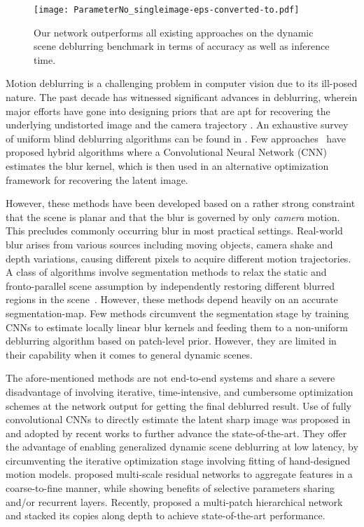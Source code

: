 \documentclass[letterpaper]{article} \usepackage{aaai20}  \usepackage{times}  \usepackage{helvet} \usepackage{courier}  \usepackage[hyphens]{url}  \usepackage{graphicx} \urlstyle{rm} \def\UrlFont{\rm}  \usepackage{graphicx}  \frenchspacing  \setlength{\pdfpagewidth}{8.5in}  \setlength{\pdfpageheight}{11in}
\begin{document}
\begin{figure}[t]
\begin{center}
  \texttt{[image: ParameterNo\_singleimage-eps-converted-to.pdf]}

\end{center}
  \caption{Our network outperforms all existing approaches on the dynamic scene deblurring benchmark in terms of accuracy as well as inference time.}
\label{fig:time}
\end{figure}

Motion deblurring is a challenging problem in computer vision due to its ill-posed nature. The past decade has witnessed significant advances in deblurring, wherein major efforts have gone into designing priors that are apt for recovering the underlying undistorted image and the camera trajectory \cite{vasu2017local,yan2017image}. An exhaustive survey of uniform blind deblurring algorithms can be found in \cite{lai2016comparative}. Few approaches~\cite{chakrabarti2016neural,schuler2016learning} have proposed hybrid algorithms where a Convolutional Neural Network (CNN) estimates the blur kernel, which is then used in an alternative optimization framework for recovering the latent image. 


However, these methods have been developed based on a rather strong constraint that the scene is planar and that the blur is governed by only \textit{camera} motion. This precludes commonly occurring blur in most practical settings. Real-world blur arises from various sources including moving objects, camera shake and depth variations, causing different pixels to acquire different motion trajectories. A class of algorithms involve segmentation methods to relax the static and fronto-parallel scene assumption by independently restoring different blurred regions in the scene~\cite{hyun2013dynamic}. However, these methods depend heavily on an accurate segmentation-map. Few methods \cite{sun2015learning,gong2017motion} circumvent the segmentation stage by training CNNs to estimate locally linear blur kernels and feeding them to a non-uniform deblurring algorithm based on patch-level prior. However, they are limited in their capability when it comes to general dynamic scenes.  


The afore-mentioned methods are not end-to-end systems and share a severe disadvantage of involving iterative, time-intensive, and cumbersome optimization schemes at the network output for getting the final deblurred result. Use of fully convolutional CNNs to directly estimate the latent sharp image was proposed in~\cite{nah2017deep} and adopted by recent works to further advance the state-of-the-art. They offer the advantage of enabling generalized dynamic scene deblurring at low latency, by circumventing the iterative optimization stage involving fitting of hand-designed motion models.  \cite{nah2017deep,tao2018scale,gao2019dynamic} proposed multi-scale residual networks to aggregate features in a coarse-to-fine manner, while showing benefits of selective parameters sharing and/or recurrent layers. Recently, \cite{zhang2019deep} proposed a multi-patch hierarchical network and stacked its copies along depth to achieve state-of-the-art performance.
\end{document}

